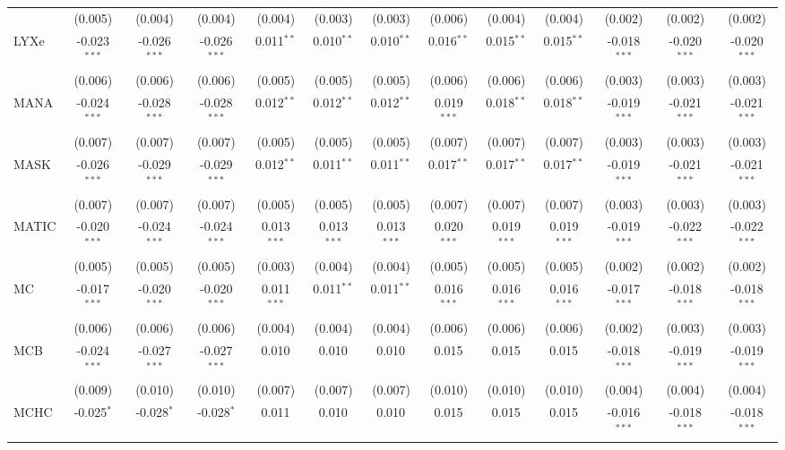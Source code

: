 \begin{table}[!htbp]
\begin{tabular}{@{\extracolsep{5pt}}lcccccccccccc}
  & (0.005) & (0.004) & (0.004) & (0.004) & (0.003) & (0.003) & (0.006) & (0.004) & (0.004) & (0.002) & (0.002) & (0.002) \\
 LYXe & -0.023$^{***}$ & -0.026$^{***}$ & -0.026$^{***}$ & 0.011$^{**}$ & 0.010$^{**}$ & 0.010$^{**}$ & 0.016$^{**}$ & 0.015$^{**}$ & 0.015$^{**}$ & -0.018$^{***}$ & -0.020$^{***}$ & -0.020$^{***}$ \\
  & (0.006) & (0.006) & (0.006) & (0.005) & (0.005) & (0.005) & (0.006) & (0.006) & (0.006) & (0.003) & (0.003) & (0.003) \\
 MANA & -0.024$^{***}$ & -0.028$^{***}$ & -0.028$^{***}$ & 0.012$^{**}$ & 0.012$^{**}$ & 0.012$^{**}$ & 0.019$^{***}$ & 0.018$^{**}$ & 0.018$^{**}$ & -0.019$^{***}$ & -0.021$^{***}$ & -0.021$^{***}$ \\
  & (0.007) & (0.007) & (0.007) & (0.005) & (0.005) & (0.005) & (0.007) & (0.007) & (0.007) & (0.003) & (0.003) & (0.003) \\
 MASK & -0.026$^{***}$ & -0.029$^{***}$ & -0.029$^{***}$ & 0.012$^{**}$ & 0.011$^{**}$ & 0.011$^{**}$ & 0.017$^{**}$ & 0.017$^{**}$ & 0.017$^{**}$ & -0.019$^{***}$ & -0.021$^{***}$ & -0.021$^{***}$ \\
  & (0.007) & (0.007) & (0.007) & (0.005) & (0.005) & (0.005) & (0.007) & (0.007) & (0.007) & (0.003) & (0.003) & (0.003) \\
 MATIC & -0.020$^{***}$ & -0.024$^{***}$ & -0.024$^{***}$ & 0.013$^{***}$ & 0.013$^{***}$ & 0.013$^{***}$ & 0.020$^{***}$ & 0.019$^{***}$ & 0.019$^{***}$ & -0.019$^{***}$ & -0.022$^{***}$ & -0.022$^{***}$ \\
  & (0.005) & (0.005) & (0.005) & (0.003) & (0.004) & (0.004) & (0.005) & (0.005) & (0.005) & (0.002) & (0.002) & (0.002) \\
 MC & -0.017$^{***}$ & -0.020$^{***}$ & -0.020$^{***}$ & 0.011$^{***}$ & 0.011$^{**}$ & 0.011$^{**}$ & 0.016$^{***}$ & 0.016$^{***}$ & 0.016$^{***}$ & -0.017$^{***}$ & -0.018$^{***}$ & -0.018$^{***}$ \\
  & (0.006) & (0.006) & (0.006) & (0.004) & (0.004) & (0.004) & (0.006) & (0.006) & (0.006) & (0.002) & (0.003) & (0.003) \\
 MCB & -0.024$^{***}$ & -0.027$^{***}$ & -0.027$^{***}$ & 0.010$^{}$ & 0.010$^{}$ & 0.010$^{}$ & 0.015$^{}$ & 0.015$^{}$ & 0.015$^{}$ & -0.018$^{***}$ & -0.019$^{***}$ & -0.019$^{***}$ \\
  & (0.009) & (0.010) & (0.010) & (0.007) & (0.007) & (0.007) & (0.010) & (0.010) & (0.010) & (0.004) & (0.004) & (0.004) \\
 MCHC & -0.025$^{*}$ & -0.028$^{*}$ & -0.028$^{*}$ & 0.011$^{}$ & 0.010$^{}$ & 0.010$^{}$ & 0.015$^{}$ & 0.015$^{}$ & 0.015$^{}$ & -0.016$^{***}$ & -0.018$^{***}$ & -0.018$^{***}$ \\

\end{tabular}
\end{table}
